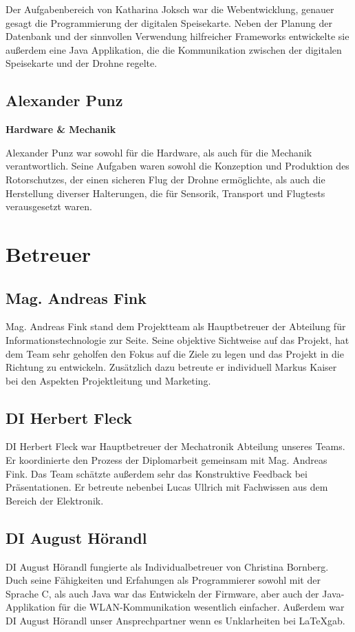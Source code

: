   Der Aufgabenbereich von Katharina Joksch war die Webentwicklung, genauer gesagt die Programmierung der digitalen Speisekarte.
  Neben der Planung der Datenbank und der sinnvollen Verwendung hilfreicher Frameworks entwickelte sie außerdem eine Java Applikation,
  die die Kommunikation zwischen der digitalen Speisekarte und der Drohne regelte.

  \subsection*{Alexander Punz}
  \textbf{Hardware \& Mechanik}

  Alexander Punz war sowohl für die Hardware, als auch für die Mechanik verantwortlich. Seine Aufgaben waren sowohl die Konzeption
  und Produktion des Rotorschutzes, der einen sicheren Flug der Drohne ermöglichte, als auch die Herstellung diverser Halterungen,
  die für Sensorik, Transport und Flugtests verausgesetzt waren.

\section{Betreuer}
  \subsection*{Mag. Andreas Fink}
  Mag. Andreas Fink stand dem Projektteam als Hauptbetreuer der Abteilung für Informationstechnologie zur Seite.
  Seine objektive Sichtweise auf das Projekt, hat dem Team sehr geholfen den Fokus auf die Ziele zu legen und
  das Projekt in die Richtung zu entwickeln.
  Zusätzlich dazu betreute er individuell Markus Kaiser bei den Aspekten Projektleitung und Marketing.

  \subsection*{DI Herbert Fleck}
  DI Herbert Fleck war Hauptbetreuer der Mechatronik Abteilung unseres Teams. Er koordinierte den Prozess der Diplomarbeit
  gemeinsam mit Mag. Andreas Fink. Das Team schätzte außerdem sehr das Konstruktive Feedback bei Präsentationen.
  Er betreute nebenbei Lucas Ullrich mit Fachwissen aus dem Bereich der Elektronik.

  \subsection*{DI August Hörandl}
  DI August Hörandl fungierte als Individualbetreuer von Christina Bornberg. Duch seine Fähigkeiten und
  Erfahungen als Programmierer sowohl mit der Sprache C, als auch Java war das Entwickeln der Firmware,
  aber auch der Java-Applikation für die WLAN-Kommunikation wesentlich einfacher. Außerdem war
  DI August Hörandl unser Ansprechpartner wenn es Unklarheiten bei \LaTeX gab.


